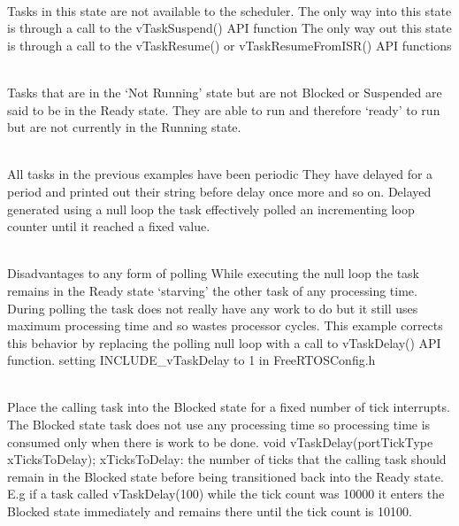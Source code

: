 \begin{description}
\os{\newpage}



\item[{\rot\bf Suspended state}]~\\[-3ex]
\bi
\ite Tasks in this state are not available to the scheduler.
\bi
\ite The only way into this state is through a call to the vTaskSuspend() API function
\ite The only way out this state is through a call to the vTaskResume() or vTaskResumeFromISR() API functions
\ei
\ei

\os{\newpage}



\item[{\rot\bf Ready state}]~\\[-3ex]
\bi
\ite Tasks that are in the ‘Not Running’ state but are not Blocked or Suspended are said to be in the Ready state.
\bi
\ite They are able to run and therefore ‘ready’ to run but are not currently in the Running state.
\ei
\ei

\os{\newpage}



\item[{\rot\bf Example 4 Using the Block state to create a delay}]~\\[-3ex]
\bi
\ite All tasks in the previous examples have been periodic
\bi
\ite They have delayed for a period and printed out their string before delay once more and so on.
\ite Delayed generated using a null loop
\bi
\ite the task effectively polled an incrementing loop counter until it reached a fixed value.
\ei
\ei
\ei

\os{\newpage}



\item[{\rot\bf Example 4 Using the Block state to create a delay}]~\\[-3ex]
\bi
\ite Disadvantages to any form of polling
\bi
\ite While executing the null loop the task remains in the Ready state ‘starving’ the other task of any processing time.
\ite During polling the task does not really have any work to do but it still uses maximum processing time and so wastes processor cycles.
\ei
\ite This example corrects this behavior by
\bi
\ite replacing the polling null loop with a call to vTaskDelay() API function.
\ite setting INCLUDE_vTaskDelay to 1 in FreeRTOSConfig.h
\ei
\ei

\os{\newpage}



\item[{\rot\bf vTaskDelay() API function}]~\\[-3ex]
\bi
\ite Place the calling task into the Blocked state for a fixed number of tick interrupts.
\bi
\ite The Blocked state task does not use any processing time so processing time is consumed only when there is work to be done.
\ite void vTaskDelay(portTickType xTicksToDelay);
\ite
\ei
\ite xTicksToDelay: the number of ticks that the calling task should remain in the Blocked state before being transitioned back into the Ready state.
\ite E.g if a task called vTaskDelay(100) while the tick count was 10000 it enters the Blocked state immediately and remains there until the tick count is 10100.
\ei


\end{description}
